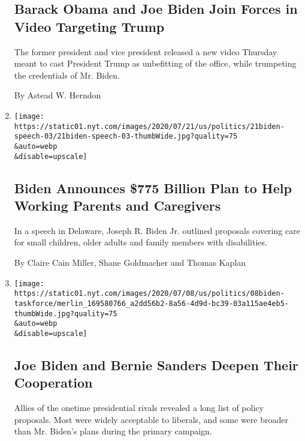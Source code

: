\begin{enumerate}
  \hypertarget{barack-obama-and-joe-biden-join-forces-in-video-targeting-trump}{%
  \subsection{Barack Obama and Joe Biden Join Forces in Video Targeting
  Trump}\label{barack-obama-and-joe-biden-join-forces-in-video-targeting-trump}}

  The former president and vice president released a new video Thursday
  meant to cast President Trump as unbefitting of the office, while
  trumpeting the credentials of Mr. Biden.

  By Astead W. Herndon
\item
  \href{/2020/07/21/us/politics/biden-workplace-childcare.html}{}

  \texttt{[image: https://static01.nyt.com/images/2020/07/21/us/politics/21biden-speech-03/21biden-speech-03-thumbWide.jpg?quality=75\\\&auto=webp\\\&disable=upscale]}

  \hypertarget{biden-announces-775-billion-plan-to-help-working-parents-and-caregivers}{%
  \subsection{Biden Announces \$775 Billion Plan to Help Working Parents
  and
  Caregivers}\label{biden-announces-775-billion-plan-to-help-working-parents-and-caregivers}}

  In a speech in Delaware, Joseph R. Biden Jr. outlined proposals
  covering care for small children, older adults and family members with
  disabilities.

  By Claire Cain Miller, Shane Goldmacher and Thomas Kaplan
\item
  \href{/2020/07/08/us/politics/biden-bernie-sanders.html}{}

  \texttt{[image: https://static01.nyt.com/images/2020/07/08/us/politics/08biden-taskforce/merlin\_169580766\_a2dd56b2-8a56-4d9d-bc39-03a115ae4eb5-thumbWide.jpg?quality=75\\\&auto=webp\\\&disable=upscale]}

  \hypertarget{joe-biden-and-bernie-sanders-deepen-their-cooperation}{%
  \subsection{Joe Biden and Bernie Sanders Deepen Their
  Cooperation}\label{joe-biden-and-bernie-sanders-deepen-their-cooperation}}

  Allies of the onetime presidential rivals revealed a long list of
  policy proposals. Most were widely acceptable to liberals, and some
  were broader than Mr. Biden's plans during the primary campaign.


\end{enumerate}
